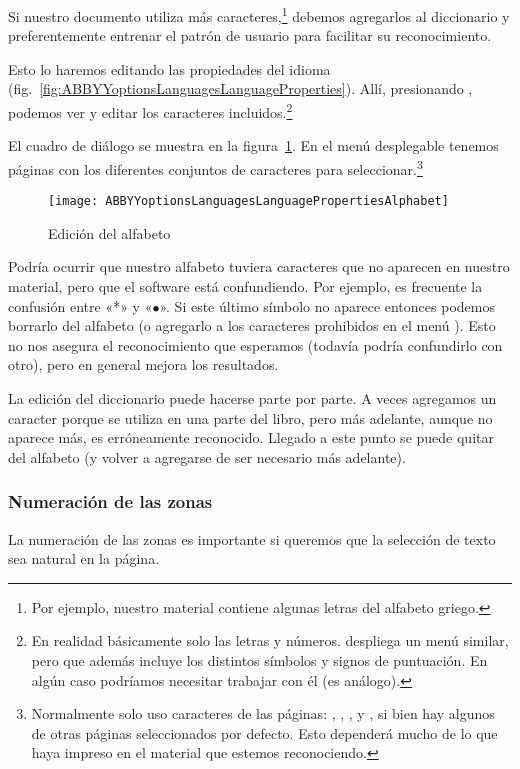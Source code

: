 \documentclass[%
	a5paper,
	10pt,
	twoside,
	openright,
	final,
]{memoir}
\begin{document}
{	Si nuestro documento utiliza más caracteres,\footnote{Por ejemplo, nuestro material contiene algunas letras del alfabeto griego.} debemos agregarlos al diccionario y preferentemente entrenar el patrón de usuario para facilitar su reconocimiento.

	Esto lo haremos editando las propiedades del idioma (fig.~\ref{fig:ABBYYoptionsLanguagesLanguageProperties}). Allí, presionando \keys{\raisebox{.25em}{\...}}, podemos ver y editar los caracteres incluidos.\footnote{En realidad básicamente solo las letras y números.  despliega un menú similar, pero que además incluye los distintos símbolos y signos de puntuación. En algún caso podríamos necesitar trabajar con él (es análogo).}

	El cuadro de diálogo se muestra en la figura~\ref{fig:ABBYYoptionsLanguagesLanguagePropertiesAlphabet}. En el menú desplegable  tenemos páginas con los diferentes conjuntos de caracteres para seleccionar.\footnote{Normalmente solo uso caracteres de las páginas: , , ,  y , si bien hay algunos de otras páginas seleccionados por defecto. Esto dependerá mucho de lo que haya impreso en el material que estemos reconociendo.}

	\begin{figure}
		\texttt{[image: ABBYYoptionsLanguagesLanguagePropertiesAlphabet]}
		\caption{Edición del alfabeto\label{fig:ABBYYoptionsLanguagesLanguagePropertiesAlphabet}}
	\end{figure}

	Podría ocurrir que nuestro alfabeto tuviera caracteres que no aparecen en nuestro material, pero que el software está confundiendo. Por ejemplo, es frecuente la confusión entre «*» y «$\bullet$». Si este último símbolo no aparece entonces podemos borrarlo del alfabeto (o agregarlo a los caracteres prohibidos en el menú ). Esto no nos asegura el reconocimiento que esperamos (todavía podría confundirlo con otro), pero en general mejora los resultados.

	La edición del diccionario puede hacerse parte por parte. A veces agregamos un caracter porque se utiliza en una parte del libro, pero más adelante, aunque no aparece más, es erróneamente reconocido. Llegado a este punto se puede quitar del alfabeto (y volver a agregarse de ser necesario más adelante).

	\subsubsection{Numeración de las zonas} La numeración de las zonas es importante si queremos que la selección de texto sea natural en la página.

}
\end{document}
